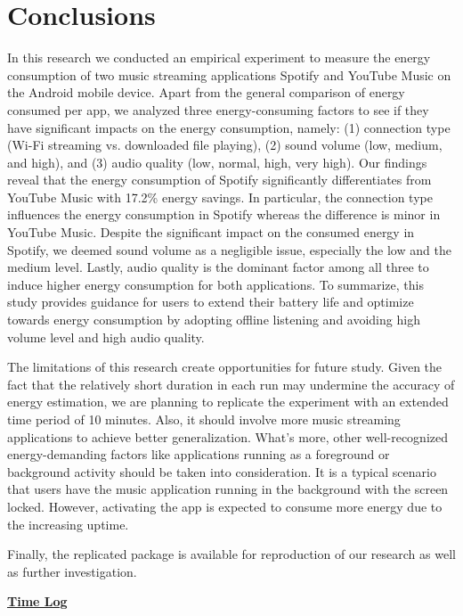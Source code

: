 \section{Conclusions}\label{sec:conclusions}

In this research we conducted an empirical experiment to measure the energy consumption of two music streaming applications Spotify and YouTube Music on the Android mobile device. Apart from the general comparison of energy consumed per app, we analyzed three energy-consuming factors to see if they have significant impacts on the energy consumption, namely: (1) connection type (\ie Wi-Fi streaming vs. downloaded file playing), (2) sound volume (\ie low, medium, and high), and (3) audio quality (\ie low, normal, high, very high). Our findings reveal that the energy consumption of Spotify significantly differentiates from YouTube Music with 17.2\% energy savings. In particular, the connection type influences the energy consumption in Spotify whereas the difference is minor in YouTube Music. Despite the significant impact on the consumed energy in Spotify, we deemed sound volume as a negligible issue, especially the low and the medium level. Lastly, audio quality is the dominant factor among all three to induce higher energy consumption for both applications. To summarize, this study provides guidance for users to extend their battery life and optimize towards energy consumption by adopting offline listening and avoiding high volume level and high audio quality.

The limitations of this research create opportunities for future study. Given the fact that the relatively short duration in each run may undermine the accuracy of energy estimation, we are planning to replicate the experiment with an extended time period of 10 minutes. Also, it should involve more music streaming applications to achieve better generalization. What’s more, other well-recognized energy-demanding factors like applications running as a foreground or background activity should be taken into consideration. It is a typical scenario that users have the music application running in the background with the screen locked. However, activating the app is expected to consume more energy due to the increasing uptime.

Finally, the replicated package is available for reproduction of our research as well as further investigation. 

\href{https://docs.google.com/spreadsheets/d/1w2QG47_3Y9-IXbPPSM2fw1bH0ZvWMfadzRdfwqmWBtI/edit?usp=sharing}{\textbf{Time Log}}